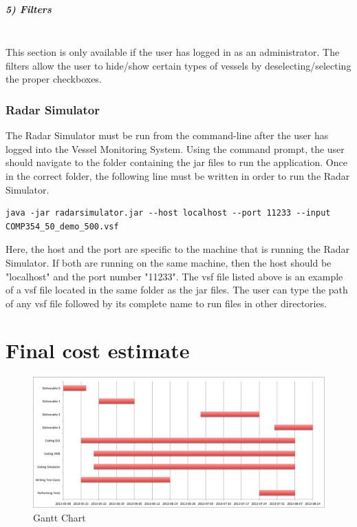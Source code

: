 \documentclass{article}
\begin{document}
\subparagraph{5) Filters \\ \\}
This section is only available if the user has logged in as an administrator. The filters allow the user to hide/show certain types of vessels by deselecting/selecting the proper checkboxes.\\

\subsubsection{Radar Simulator}
The Radar Simulator must be run from the command-line after the user has logged into the Vessel Monitoring System. Using the command prompt, the user should navigate to the folder containing the jar files to run the application. Once in the correct folder, the following line must be written in order to run the Radar Simulator.

\begin{verbatim}
java -jar radarsimulator.jar --host localhost --port 11233 --input COMP354_50_demo_500.vsf
\end{verbatim}

Here, the host and the port are specific to the machine that is running the Radar Simulator. If both are running on the same machine, then the host should be "localhost" and the port number "11233". The vsf file listed above is an example of a vsf file located in the same folder as the jar files. The user can type the path of any vsf file followed by its complete name to run files in other directories.

\break

\section{Final cost estimate} %


\begin{figure}[!htb]
\caption{Gantt Chart}
\centering
\includegraphics[scale=0.55]{charts/GanttChart.png}
\end{figure}
\end{document}
